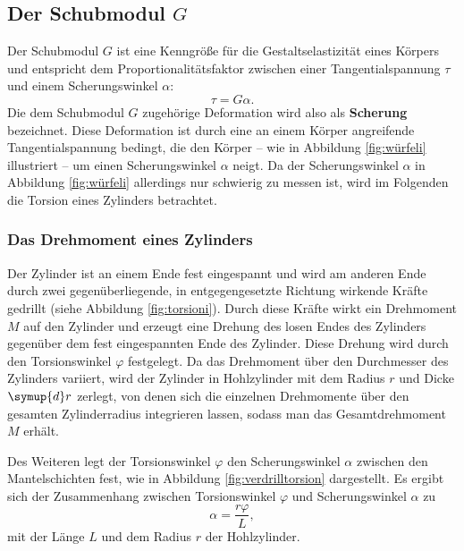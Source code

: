 \subsection{Der Schubmodul $G$}

Der Schubmodul $G$ ist eine Kenngröße für die Gestaltselastizität eines Körpers und entspricht 
dem Proportionalitätsfaktor zwischen einer Tangentialspannung $\tau$ und einem Scherungswinkel 
$\alpha$:
\begin{equation}
	\label{eqn:schubimoduli}
	\tau = G \alpha \mathrm{.}
\end{equation}
Die dem Schubmodul $G$ zugehörige Deformation wird also als \textbf{Scherung} bezeichnet.
Diese Deformation ist durch eine an einem Körper angreifende Tangentialspannung bedingt, die 
den Körper -- wie in Abbildung \ref{fig:würfeli} illustriert -- um einen Scherungswinkel $\alpha$
neigt.
Da der Scherungswinkel $\alpha$ in Abbildung \ref{fig:würfeli} allerdings nur schwierig zu messen
ist, wird im Folgenden die Torsion eines Zylinders betrachtet.

\subsubsection{Das Drehmoment eines Zylinders}
Der Zylinder ist an einem Ende fest eingespannt und wird am anderen Ende durch zwei
gegenüberliegende, in entgegengesetzte Richtung wirkende Kräfte gedrillt (siehe Abbildung 
\ref{fig:torsioni}).
Durch diese Kräfte wirkt ein Drehmoment $M$ auf den Zylinder und erzeugt eine Drehung des losen
Endes des Zylinders gegenüber dem fest eingespannten Ende des Zylinder. Diese Drehung wird 
durch den Torsionswinkel $\varphi$ festgelegt.
Da das Drehmoment über den Durchmesser des Zylinders variiert, wird der Zylinder in Hohlzylinder 
mit dem Radius $r$ und Dicke $\symup{d} r$ zerlegt, von denen sich die einzelnen Drehmomente 
über den gesamten Zylinderradius integrieren lassen, sodass man das Gesamtdrehmoment $M$ 
erhält.

Des Weiteren legt der Torsionswinkel $\varphi$ den Scherungswinkel $\alpha$ zwischen den 
Mantelschichten fest, wie in Abbildung \ref{fig:verdrilltorsion} dargestellt.
Es ergibt sich der Zusammenhang zwischen Torsionswinkel $\varphi$ und Scherungswinkel $\alpha$ 
zu 
\begin{equation}
	\label{eqn:variphi}
	\alpha = \frac{r \varphi}{L} \mathrm{,}
\end{equation}
mit der Länge $L$ und dem Radius $r$ der Hohlzylinder.

